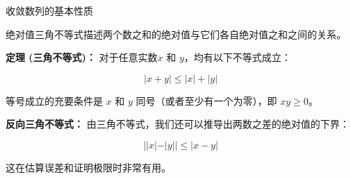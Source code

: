 \documentclass[aspectratio=169,10pt,fontset=fandol]{ctexbeamer}
\begin{document}
\begin{frame}[t,fragile]{收敛数列的基本性质}
\normalsize
{\normalsize
绝对值三角不等式描述两个数之和的绝对值与它们各自绝对值之和之间的关系。

	

	\textbf{定理 (三角不等式)：} 对于任意实数$x$ 和 $y$，均有以下不等式成立：

	\begin{equation*}

		|x + y| \le |x| + |y|

	\end{equation*}

	

	等号成立的充要条件是 $x$ 和 $y$ 同号（或者至少有一个为零），即 $xy \ge 0$。

	

	\textbf{反向三角不等式：} 由三角不等式，我们还可以推导出两数之差的绝对值的下界：

	\begin{equation*}

		||x| - |y|| \le |x - y|

	\end{equation*}

	这在估算误差和证明极限时非常有用。


}
\end{frame}
\end{document}
